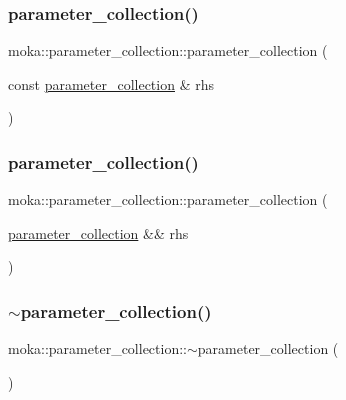 \subsubsection{\texorpdfstring{parameter\_collection()}{parameter\_collection()}\hspace{0.1cm}{\footnotesize\ttfamily [2/4]}}
{\footnotesize\ttfamily moka\+::parameter\+\_\+collection\+::parameter\+\_\+collection (\begin{DoxyParamCaption}\item[{const \mbox{\hyperlink{classmoka_1_1parameter__collection}{parameter\+\_\+collection}} \&}]{rhs }\end{DoxyParamCaption})}

\mbox{\label{classmoka_1_1parameter__collection_a1d3e96c869b3a52dd757216cea4d5c1b}} 
\subsubsection{\texorpdfstring{parameter\_collection()}{parameter\_collection()}\hspace{0.1cm}{\footnotesize\ttfamily [3/4]}}
{\footnotesize\ttfamily moka\+::parameter\+\_\+collection\+::parameter\+\_\+collection (\begin{DoxyParamCaption}\item[{\mbox{\hyperlink{classmoka_1_1parameter__collection}{parameter\+\_\+collection}} \&\&}]{rhs }\end{DoxyParamCaption})\hspace{0.3cm}{\ttfamily [noexcept]}}

\mbox{\label{classmoka_1_1parameter__collection_a1b0d2b9b9b86e1de98ceb2262cf14935}} 
\subsubsection{\texorpdfstring{$\sim$parameter\_collection()}{~parameter\_collection()}}
{\footnotesize\ttfamily moka\+::parameter\+\_\+collection\+::$\sim$parameter\+\_\+collection (\begin{DoxyParamCaption}{ }\end{DoxyParamCaption})}

